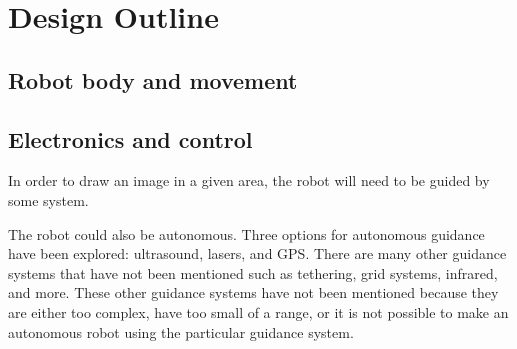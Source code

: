 

\chapter{Design Outline}\label{design outline}\label{section \thechapter}

\label{outline: aims and motivations}


\section{Robot body and movement}\label{outline: body and movement}

    \label{outline: chassis}
    \label{outline: movement}
    \label{outline: motors}
    \label{outline: drawing tool}

\section{Electronics and control}\label{outline: electronics and control}
    \label{outline: guidance}
        In order to draw an image in a given area, the robot will need to be guided by some system. 

        The robot could also be autonomous. Three options for autonomous guidance have been explored: ultrasound, lasers, and \gls{GPS}. There are many other guidance systems that have not been mentioned such as tethering, grid systems, infrared, and more. These other guidance systems have not been mentioned because they are either too complex, have too small of a range, or it is not possible to make an autonomous robot using the particular guidance system.

